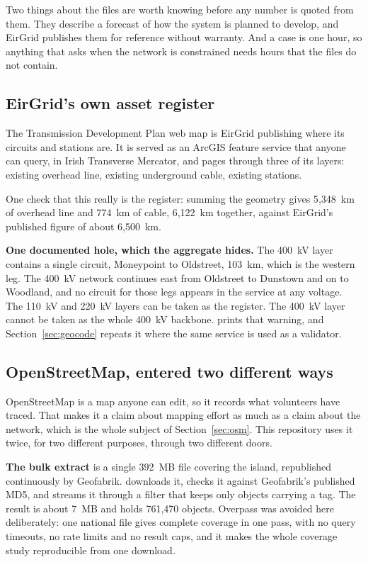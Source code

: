 \documentclass[11pt,a4paper]{article}
\begin{document}
Two things about the files are worth knowing before any number is quoted from
them. They describe a forecast of how the system is planned to develop, and
EirGrid publishes them for reference without warranty. And a case
is one hour, so anything that asks when the network is constrained needs hours
that the files do not contain.

\subsection{EirGrid's own asset register}

The Transmission Development Plan web map is EirGrid publishing where its
circuits and stations are. It is served as an ArcGIS feature service that
anyone can query, in Irish Transverse Mercator, and  pages
through three of its layers: existing overhead line, existing underground
cable, existing stations.

One check that this really is the register: summing the
geometry gives 5{,}348~km of overhead line and 774~km of cable, 6{,}122~km
together, against EirGrid's published figure of about 6{,}500~km.

\textbf{One documented hole, which the aggregate hides.} The 400~kV layer
contains a single circuit, Moneypoint to Oldstreet, 103~km, which is the
western leg. The 400~kV network continues east from Oldstreet to Dunstown and
on to Woodland, and no circuit for those legs appears in the service at any
voltage. The 110~kV and 220~kV layers can be taken as the register. The 400~kV
layer cannot be taken as the whole 400~kV backbone. 
prints that warning, and Section~\ref{sec:geocode} repeats it where the same
service is used as a validator.

\subsection{OpenStreetMap, entered two different ways}

OpenStreetMap is a map anyone can edit, so it records what volunteers have
traced. That makes it a claim about mapping effort as much as a claim about
the network, which is the whole subject of Section~\ref{sec:osm}. This
repository uses it twice, for two different purposes, through two different
doors.

\textbf{The bulk extract} is a single 392~MB file covering the island,
republished continuously by Geofabrik.  downloads it, checks
it against Geofabrik's published MD5, and streams it through a filter that
keeps only objects carrying a  tag. The result is about 7~MB and
holds 761{,}470 objects. Overpass was avoided here deliberately: one national
file gives complete coverage in one pass, with no query timeouts, no rate
limits and no result caps, and it makes the whole coverage study reproducible
from one download.
\end{document}
